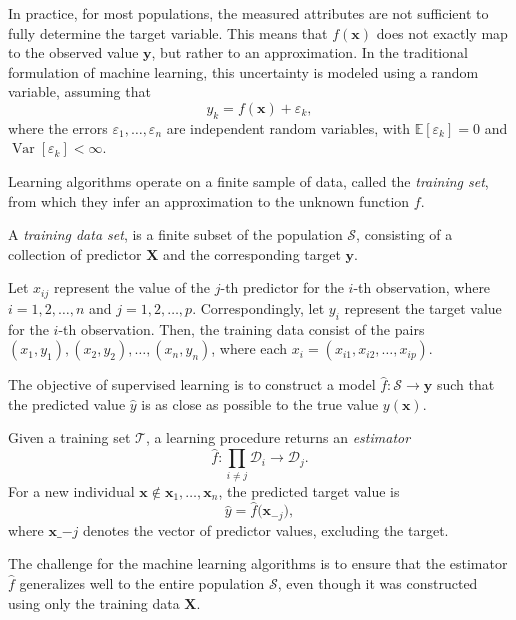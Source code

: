 In practice, for most populations, the measured attributes are not sufficient to fully determine the target variable. This means that $f(\mathbf{x})$ does not exactly map to the observed value $\mathbf{y}$, but rather to an approximation. In the traditional formulation of machine learning, this uncertainty is modeled using a random variable, assuming that
\[
y_k = f(\mathbf{x}) + \varepsilon_k,
\]
where the errors $\varepsilon_1, \dots, \varepsilon_n$ are independent random variables, with $\mathbb{E}[\varepsilon_k] = 0$ and $\operatorname{Var}[\varepsilon_k] < \infty$.

Learning algorithms operate on a finite sample of data, called the \emph{training set}, from which they infer an approximation to the unknown function $f$.

\begin{definition}
A \emph{training data set}, is a finite subset of the population $\mathcal{S}$, consisting of a collection of predictor $\mathbf{X}$ and the corresponding target $\mathbf{y}$.
\end{definition}

Let $x_{ij}$ represent the value of the $j$-th predictor for the $i$-th observation, where $i = 1, 2, \ldots, n$ and $j = 1, 2, \ldots, p$. Correspondingly, let $y_i$ represent the target value for the $i$-th observation. Then, the training data consist of the pairs ${(x_1, y_1), (x_2, y_2), \ldots, (x_n, y_n)}$, where each $x_i = (x_{i1}, x_{i2}, \ldots, x_{ip})$.

The objective of supervised learning is to construct a model $\hat{f}: \mathcal{S} \rightarrow \mathbf{y}$ such that the predicted value $\hat{y}$ is as close as possible to the true value $y(\mathbf{x})$.

\begin{definition}
Given a training set $\mathcal{T}$, a learning procedure returns an \emph{estimator}
\[
\hat{f}:\prod_{i \ne j} \mathcal{D}_{i} \longrightarrow \mathcal{D}_{j}.
\]
For a new individual $\mathbf{x} \notin {\mathbf{x}_{1}, \dots, \mathbf{x}_{n}}$, the predicted target value is
\[
\hat{y} = \hat{f}\bigl(\mathbf{x}_{-j}\bigr),
\]
where $\mathbf{x}\_{-j}$ denotes the vector of predictor values, excluding the target.
\end{definition}

The challenge for the machine learning algorithms is to ensure that the estimator $\hat{f}$ generalizes well to the entire population $\mathcal{S}$, even though it was constructed using only the training data $\mathbf{X}$.

